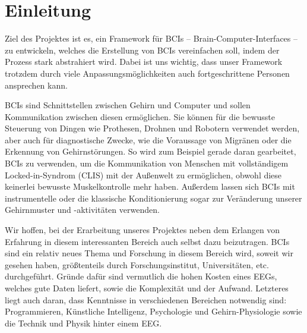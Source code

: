\documentclass[10pt]{article}
\begin{document}
\newpage


\section{Einleitung}
Ziel des Projektes ist es, ein Framework für BCIs -- Brain-Computer-Interfaces -- zu entwickeln, welches die Erstellung von BCIs vereinfachen soll, indem der Prozess stark abstrahiert wird.
Dabei ist uns wichtig, dass unser Framework trotzdem durch viele Anpassungsmöglichkeiten auch fortgeschrittene Personen ansprechen kann.

BCIs sind Schnittstellen zwischen Gehirn und Computer und sollen Kommunikation zwischen diesen ermöglichen.
Sie können für die bewusste Steuerung von Dingen wie Prothesen, Drohnen und Robotern verwendet werden, aber auch für diagnostische Zwecke, wie die Voraussage von Migränen oder die Erkennung von Gehirnstörungen.
So wird zum Beispiel gerade daran gearbeitet, BCIs zu verwenden, um die Kommunikation von Menschen mit vollständigem Locked-in-Syndrom (CLIS) mit der Außenwelt zu ermöglichen, obwohl diese keinerlei bewusste Muskelkontrolle mehr haben. \cite{BCIChaudhary}
Außerdem lassen sich BCIs mit instrumentelle oder die klassische Konditionierung sogar zur Veränderung unserer Gehirnmuster und -aktivitäten verwenden. \cite{BCIChaudhary}

	
Wir hoffen, bei der Erarbeitung unseres Projektes neben dem Erlangen von Erfahrung in diesem interessanten Bereich auch selbst dazu beizutragen.
BCIs sind ein relativ neues Thema und Forschung in diesem Bereich wird, soweit wir gesehen haben, größtenteils durch Forschungsinstitut, Universitäten, etc. durchgeführt.
Gründe dafür sind vermutlich die hohen Kosten eines EEGs, welches gute Daten liefert, sowie die Komplexität und der Aufwand.
Letzteres liegt auch daran, dass Kenntnisse in verschiedenen Bereichen notwendig sind: Programmieren, Künstliche Intelligenz, Psychologie und Gehirn-Physiologie sowie die Technik und Physik hinter einem EEG.
\end{document}
